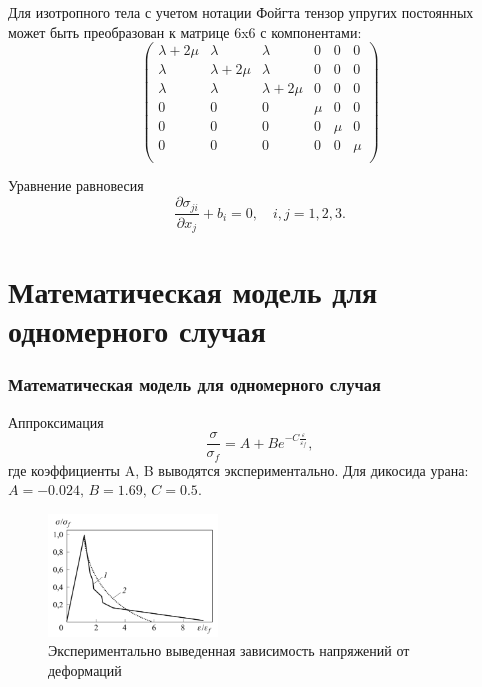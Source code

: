 \documentclass[unicode]{beamer}
\begin{document}
    \begin{frame}
        \begin{block}{}
            Для изотропного тела с учетом нотации Фойгта тензор упругих постоянных может быть преобразован к матрице $6$x$6$ с компонентами:
            \[
                \begin{pmatrix}
                    \lambda + 2\mu & \lambda & \lambda & 0 & 0 & 0 \\
                    \lambda & \lambda + 2\mu & \lambda & 0 & 0 & 0 \\
                    \lambda & \lambda & \lambda + 2\mu & 0 & 0 & 0 \\
                         0 &      0 &      0 & \mu & 0 & 0 \\
                         0 &      0 &      0 & 0 & \mu & 0 \\
                         0 &      0 &      0 & 0 & 0 & \mu \\
                  \end{pmatrix} 
            \]
        \end{block}

        \begin{block}{Уравнение равновесия}
            \fontsize{10.4pt}{12pt}\selectfont
            \[
              \dfrac{\partial \sigma_{ji}}{\partial x_j} + b_i = 0, \quad i,j = 1, 2, 3.
            \]
        \end{block}
    \end{frame}

    \section{Математическая модель для одномерного случая}
    \begin{frame}        
        \frametitle{Математическая модель для одномерного случая}
        \begin{block}{Аппроксимация}
            \[
              \dfrac{\sigma}{\sigma_f} = A + B e^{-C \tfrac{\varepsilon}{\varepsilon_f}},
            \]
            \noindent где коэффициенты A, B выводятся экспериментально. Для дикосида урана:
            $
              A = -0.024,\, B = 1.69, \, C = 0.5.  
            $
        \end{block} 
        \begin{figure}
            \centering
            \includegraphics[width=0.4\textwidth]{ceramic.jpeg}
            \caption{Экспериментально выведенная зависимость напряжений от деформаций}
        \end{figure}
    \end{frame}
\end{document}
